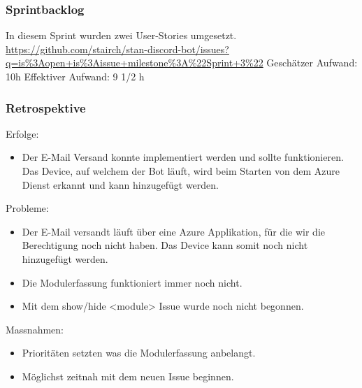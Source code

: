 \documentclass[a4paper, table]{article}
\begin{document}
\subsubsection*{Sprintbacklog}
In diesem Sprint wurden zwei User-Stories umgesetzt.\\
\url{https://github.com/stairch/stan-discord-bot/issues?q=is%3Aopen+is%3Aissue+milestone%3A%22Sprint+3%22}
\newline
Geschätzer Aufwand: 10h
\newline
Effektiver Aufwand: 9 1/2 h

\subsubsection*{Retrospektive}
Erfolge:
\begin{itemize}
    \item Der E-Mail Versand konnte implementiert werden und sollte funktionieren.
    Das Device, auf welchem der Bot läuft, wird beim Starten von dem Azure Dienst erkannt und kann hinzugefügt werden.
\end{itemize}
Probleme:
\begin{itemize}
    \item Der E-Mail versandt läuft über eine Azure Applikation, für die wir die Berechtigung noch nicht haben.
    Das Device kann somit noch nicht hinzugefügt werden.
    \item Die Modulerfassung funktioniert immer noch nicht.
    \item Mit dem show/hide <module> Issue wurde noch nicht begonnen.
\end{itemize}
Massnahmen:
\begin{itemize}
    \item Prioritäten setzten was die Modulerfassung anbelangt.
    \item Möglichst zeitnah mit dem neuen Issue beginnen.
\end{itemize}
\end{document}
